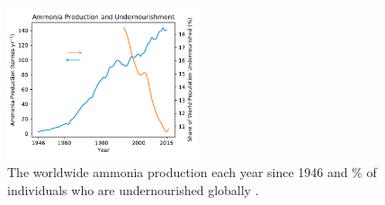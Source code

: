 \begin{figure}
    \centering
    \includegraphics[width=0.5\textwidth]{Figures/ammonia_production.pdf}
    \caption{The worldwide ammonia production each year since 1946 \cite{Kelly_2005} and \% of individuals who are undernourished globally \cite{owidhungerandundernourishment}.}
    \label{fig:ammonia_prod}
\end{figure}







